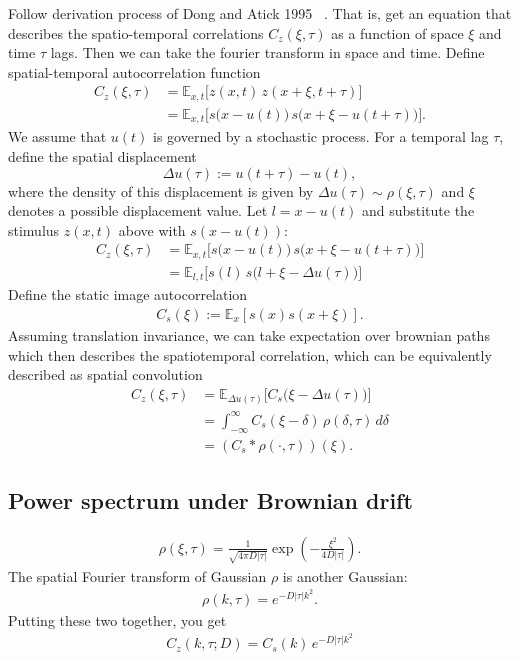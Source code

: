 \documentclass[12pt]{article}
\begin{document}
Follow derivation process of Dong and Atick 1995 ~\cite{dong1995}. That is, get an equation that describes the spatio-temporal correlations $C_z(\xi,\tau)$ as a function of space $\xi$ and time $\tau$ lags. Then we can take the fourier transform in space and time. 
Define spatial-temporal autocorrelation function
\begin{align}
    C_z(\xi,\tau) &= \mathbb E_{x,t}\!\Big[ z(x,t)\,z(x+\xi,t+\tau) \Big] \\
           &= \mathbb E_{x,t}\!\Big[s\big(x-u(t)\big)\,s\big(x+\xi-u(t+\tau)\big) \Big].
\end{align}
We assume that $u(t)$ is governed by a stochastic process. For a temporal lag $\tau$, define the spatial displacement
\begin{equation}
    \Delta u(\tau) := u(t+\tau)-u(t),
\end{equation}
where the density of this displacement is given by $\Delta u(\tau) \sim \rho(\xi,\tau)$ and $\xi$ denotes a possible displacement value. Let $l = x - u(t)$ and substitute the stimulus $z(x,t)$ above with $s(x-u(t))$:
\begin{align}
    C_z(\xi,\tau) &= \mathbb E_{x,t}\!\Big[s\big(x-u(t)\big)\,s\big(x+\xi-u(t+\tau)\big) \Big] \\
        &= \mathbb E_{l,t}\Big[ s(l)\,s\big(l+\xi-\Delta u(\tau)\big)\Big]
\end{align}
Define the static image autocorrelation
\begin{align}
    C_s(\xi) := \mathbb E_{x}[s(x)s(x+\xi)].    
\end{align}
Assuming translation invariance, we can take expectation over brownian paths which then describes the spatiotemporal correlation, which can be equivalently described as spatial convolution
\begin{align}
    C_z(\xi,\tau) &= \mathbb E_{\Delta u(\tau)}\!\Big[C_s\big(\xi-\Delta u(\tau)\big)\Big] \\
           &=  \int_{-\infty}^{\infty} C_s(\xi-\delta)\,\rho(\delta,\tau)\,d\delta\\
           &= (C_s*\rho(\cdot,\tau))(\xi).
\end{align}


\subsection{Power spectrum under Brownian drift} \label{sec:app_drift}

\begin{align}
    \rho(\xi,\tau) = \frac{1}{\sqrt{4\pi D|\tau|}} \exp\!\left( -\frac{\xi^2}{4D|\tau|} \right).
\end{align}
The spatial Fourier transform of Gaussian $\rho$ is another Gaussian:
\begin{align}
    \rho(k,\tau) = e^{-D|\tau|k^2}.
\end{align}
Putting these two together, you get
\begin{align}
    C_z(k,\tau;D)=C_s(k)\,e^{-D|\tau|k^2}
\end{align}
\end{document}

